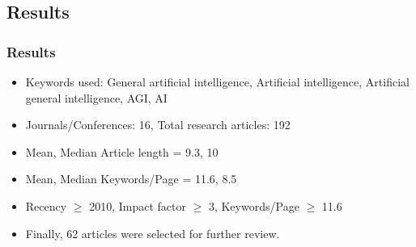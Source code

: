 \documentclass[
	11pt, %
]{beamer}
\begin{document}
\subsection{Results}
\begin{frame}
	\frametitle{Results}
		
	\begin{itemize}

        \item Keywords used: General artificial intelligence, Artificial intelligence, Artificial general intelligence, AGI, AI

        \bigskip %
    	\item Journals/Conferences: 16, Total research articles: 192

        \bigskip %
    	\item Mean, Median Article length = 9.3, 10

        \bigskip %
    	\item Mean, Median Keywords/Page = 11.6, 8.5
     
        \bigskip %
        \item Recency $\geq$ 2010, Impact factor $\geq$ 3, Keywords/Page $\geq$ 11.6
        
        \bigskip %
        \item Finally, 62 articles were selected for further review.

	\end{itemize}
 
\end{frame}

\end{document}
